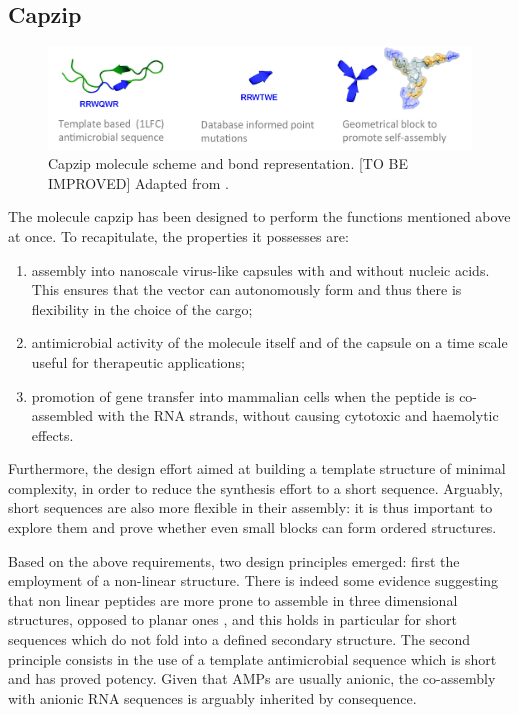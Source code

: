 \subsection{Capzip} \label{sec:capzip}

\begin{figure}
\begin{center}
\includegraphics[width = \textwidth]{1introduction/pics/capzip.png}
\caption[Cazip molecule]{Capzip molecule scheme and bond representation. [TO BE IMPROVED] Adapted from \cite{Castelletto2016}.} \label{fig:capzip}
\end{center}
\end{figure}

The molecule capzip has been designed to perform the functions mentioned above at once. To recapitulate, the properties it possesses are:
\begin{enumerate}
\item assembly into nanoscale virus-like capsules with and without nucleic acids. This ensures that the vector can autonomously form and thus there is flexibility in the choice of the cargo;
\item antimicrobial activity of the molecule itself and of the capsule on a time scale useful for therapeutic applications;
\item promotion of gene transfer into mammalian cells when the peptide is co-assembled with the RNA strands, without causing cytotoxic and haemolytic effects.
\end{enumerate}
%
Furthermore, the design effort aimed at building a template structure of minimal complexity, in order to reduce the synthesis effort to a short sequence. Arguably, short sequences are also more flexible in their assembly: it is thus important to explore them and prove whether even small blocks can form ordered structures.

Based on the above requirements, two design principles emerged: first the employment of a non-linear structure. There is indeed some evidence suggesting that non linear peptides are more prone to assemble in three dimensional structures, opposed to planar ones \cite{???}, and this holds in particular for short sequences which do not fold into a defined secondary structure.
%
The second principle consists in the use of a template antimicrobial sequence which is short and has proved potency.
%
Given that AMPs are usually anionic, the co-assembly with anionic RNA sequences is arguably inherited by consequence.

